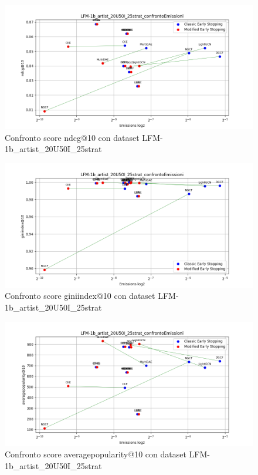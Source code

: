 \begin{figure}[H]
    \centering
    \includegraphics[width=\linewidth, trim=0 0 0 0]{images/ndcg@10_LFM-1b_artist_20U50I_25strat_comparison.png}
    \caption{Confronto score ndcg@10 con dataset LFM-1b\_artist\_20U50I\_25strat}
    
\end{figure}

\begin{figure}[H]
    \centering
    \includegraphics[width=\linewidth, trim=0 0 0 0]{images/giniindex@10_LFM-1b_artist_20U50I_25strat_comparison.png}
    \caption{Confronto score giniindex@10 con dataset LFM-1b\_artist\_20U50I\_25strat}
\end{figure}

\begin{figure}[H]
    \centering
    \includegraphics[width=\linewidth, trim=0 0 0 0]{images/averagepopularity@10_LFM-1b_artist_20U50I_25strat_comparison.png}
    \caption{Confronto score averagepopularity@10 con dataset LFM-1b\_artist\_20U50I\_25strat}
\end{figure}


